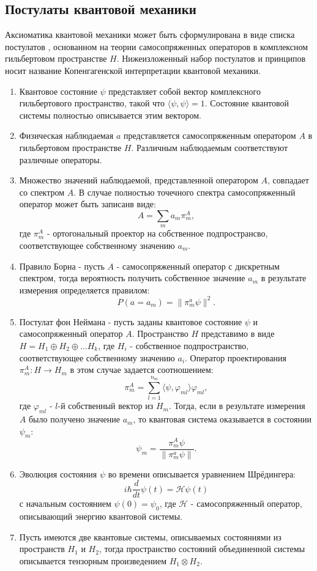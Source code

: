 \documentclass[11pt]{article}
\begin{document}
\subsection{Постулаты квантовой механики}
Аксиоматика квантовой механики может быть сформулирована в виде списка постулатов \cite{Khrennikov_information}, основанном на теории самосопряженных операторов в комплексном гильбертовом пространстве $H$. Нижеизложенный набор постулатов и принципов носит название Копенгагенской интерпретации квантовой механики.
\begin{enumerate}[label=\bfseries Постулат \arabic*:, align=left]
  \item Квантовое состояние $\psi$ представляет собой вектор комплексного гильбертового пространство, такой что $\langle\psi, \psi\rangle = 1$. Состояние квантовой системы полностью описывается этим вектором.
  \item Физическая наблюдаемая $a$ представляется самосопряженным оператором $A$ в гильбертовом пространстве $H$. Различным наблюдаемым соответствуют различные операторы.
  \item Множество значений наблюдаемой, представленной оператором $A$, совпадает со спектром $A$. В случае полностью точечного спектра самосопряженный оператор может быть записанв виде:
  \[
  A = \sum_m a_m\pi_m^A,
  \]
    где $\pi_m^A$ - ортогональный проектор на собственное подпространсво, соответствующее собственному значению $a_m$.
  \item Правило Борна - пусть $A$ - самосопряженный оператор с дискретным спектром, тогда вероятность получить собственное значение $a_m$ в результате измерения определяется правилом:
  \[
  P(a = a_m) = \| \pi_m^a\psi\|^2.
  \]
  \item Постулат фон Неймана - пусть заданы квантовое состояние $\psi$ и самосопряженный оператор $A$. Пространство $H$ представимо в виде $H = H_1\oplus H_2\oplus\ldots H_k$, где $H_i$ - собственное подпространство, соответствующее собственному значению $a_i$. Оператор проектирования $\pi_m^A: H\to H_m$ в этом случае задается соотношением: 
  \[
  \pi_m^A = \sum_{l = 1}^{n_m}\langle\psi,\varphi_{ml}\rangle\varphi_{ml},
  \]
  где $\varphi_{ml}$ - $l$-й собственный вектор из $H_m$.
  Тогда, если в результате измерения $A$  было получено значение $a_m$, то квантовая система оказывается в состоянии $\psi_m$:
  \[
  \psi_m = \frac{\pi_m^A\psi}{ \| \pi_m^a\psi\|}.
  \] 
  \item Эволюция состояния $\psi$ во времени описывается уравнением Шрёдингера:
  \[
  i\hbar \dfrac{d}{dt}\psi(t) = \mathcal{\mathcal{H}}\psi(t)
  \] 
  с начальным состоянием $\psi(0) = \psi_0$, 
  где $\mathcal{H}$  - самосопряженный оператор, описывающий энергию квантовой системы. 
  \item Пусть имеются две квантовые системы, описываемых состояниями из пространств $H_1$ и $H_2$, тогда пространство состояний объединенной системы описывается тензорным произведением $H_1 \otimes H_2$.  
\end{enumerate}
\end{document}
